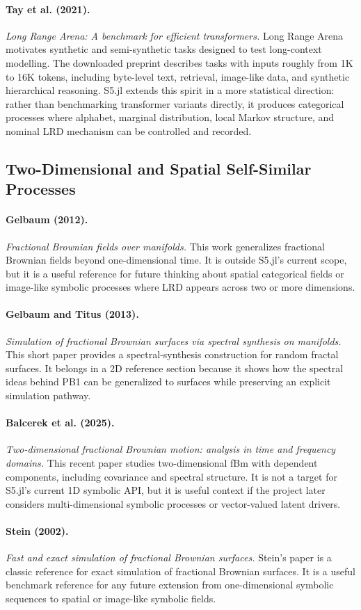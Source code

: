 \documentclass[11pt]{article}
\begin{document}
\paragraph{Tay et al. (2021).}
\emph{Long Range Arena: A benchmark for efficient transformers.}
Long Range Arena motivates synthetic and semi-synthetic tasks designed to test
long-context modelling. The downloaded preprint describes tasks with inputs
roughly from 1K to 16K tokens, including byte-level text, retrieval, image-like
data, and synthetic hierarchical reasoning. S5.jl extends this spirit in a more
statistical direction: rather than benchmarking transformer variants directly,
it produces categorical processes where alphabet, marginal distribution, local
Markov structure, and nominal LRD mechanism can be controlled and recorded.

\subsection{Two-Dimensional and Spatial Self-Similar Processes}

\paragraph{Gelbaum (2012).}
\emph{Fractional Brownian fields over manifolds.}
This work generalizes fractional Brownian fields beyond one-dimensional time.
It is outside S5.jl's current scope, but it is a useful reference for future
thinking about spatial categorical fields or image-like symbolic processes where
LRD appears across two or more dimensions.

\paragraph{Gelbaum and Titus (2013).}
\emph{Simulation of fractional Brownian surfaces via spectral synthesis on
manifolds.}
This short paper provides a spectral-synthesis construction for random fractal
surfaces. It belongs in a 2D reference section because it shows how the spectral
ideas behind PB1 can be generalized to surfaces while preserving an explicit
simulation pathway.

\paragraph{Balcerek et al. (2025).}
\emph{Two-dimensional fractional Brownian motion: analysis in time and frequency
domains.}
This recent paper studies two-dimensional fBm with dependent components,
including covariance and spectral structure. It is not a target for S5.jl's
current 1D symbolic API, but it is useful context if the project later considers
multi-dimensional symbolic processes or vector-valued latent drivers.

\paragraph{Stein (2002).}
\emph{Fast and exact simulation of fractional Brownian surfaces.}
Stein's paper is a classic reference for exact simulation of fractional Brownian
surfaces. It is a useful benchmark reference for any future extension from
one-dimensional symbolic sequences to spatial or image-like symbolic fields.
\end{document}
